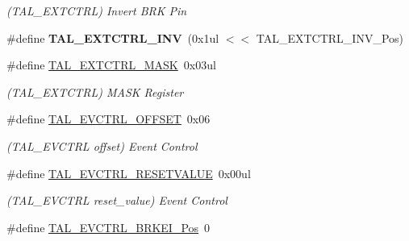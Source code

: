 \begin{DoxyCompactItemize}
\begin{DoxyCompactList}\small\item\em (T\+A\+L\+\_\+\+E\+X\+T\+C\+T\+R\+L) Invert B\+R\+K Pin \end{DoxyCompactList}\item 
\hypertarget{group___s_a_m_l21___t_a_l_ga1de28ed6472c8181076367a653276a4c}{}\#define {\bfseries T\+A\+L\+\_\+\+E\+X\+T\+C\+T\+R\+L\+\_\+\+I\+N\+V}~(0x1ul $<$$<$ T\+A\+L\+\_\+\+E\+X\+T\+C\+T\+R\+L\+\_\+\+I\+N\+V\+\_\+\+Pos)\label{group___s_a_m_l21___t_a_l_ga1de28ed6472c8181076367a653276a4c}

\item 
\hypertarget{group___s_a_m_l21___t_a_l_ga2a733cb31a08ef29f46f0e4d20744472}{}\#define \hyperlink{group___s_a_m_l21___t_a_l_ga2a733cb31a08ef29f46f0e4d20744472}{T\+A\+L\+\_\+\+E\+X\+T\+C\+T\+R\+L\+\_\+\+M\+A\+S\+K}~0x03ul\label{group___s_a_m_l21___t_a_l_ga2a733cb31a08ef29f46f0e4d20744472}

\begin{DoxyCompactList}\small\item\em (T\+A\+L\+\_\+\+E\+X\+T\+C\+T\+R\+L) M\+A\+S\+K Register \end{DoxyCompactList}\item 
\hypertarget{group___s_a_m_l21___t_a_l_ga7ecf7114070a93a38e7a72219c9738c9}{}\#define \hyperlink{group___s_a_m_l21___t_a_l_ga7ecf7114070a93a38e7a72219c9738c9}{T\+A\+L\+\_\+\+E\+V\+C\+T\+R\+L\+\_\+\+O\+F\+F\+S\+E\+T}~0x06\label{group___s_a_m_l21___t_a_l_ga7ecf7114070a93a38e7a72219c9738c9}

\begin{DoxyCompactList}\small\item\em (T\+A\+L\+\_\+\+E\+V\+C\+T\+R\+L offset) Event Control \end{DoxyCompactList}\item 
\hypertarget{group___s_a_m_l21___t_a_l_ga5622c3ebd8e449c5852d22802065c955}{}\#define \hyperlink{group___s_a_m_l21___t_a_l_ga5622c3ebd8e449c5852d22802065c955}{T\+A\+L\+\_\+\+E\+V\+C\+T\+R\+L\+\_\+\+R\+E\+S\+E\+T\+V\+A\+L\+U\+E}~0x00ul\label{group___s_a_m_l21___t_a_l_ga5622c3ebd8e449c5852d22802065c955}

\begin{DoxyCompactList}\small\item\em (T\+A\+L\+\_\+\+E\+V\+C\+T\+R\+L reset\+\_\+value) Event Control \end{DoxyCompactList}\item 
\hypertarget{group___s_a_m_l21___t_a_l_ga2a03adf261887fb55e5fe35de7057c4f}{}\#define \hyperlink{group___s_a_m_l21___t_a_l_ga2a03adf261887fb55e5fe35de7057c4f}{T\+A\+L\+\_\+\+E\+V\+C\+T\+R\+L\+\_\+\+B\+R\+K\+E\+I\+\_\+\+Pos}~0\label{group___s_a_m_l21___t_a_l_ga2a03adf261887fb55e5fe35de7057c4f}


\end{DoxyCompactItemize}
